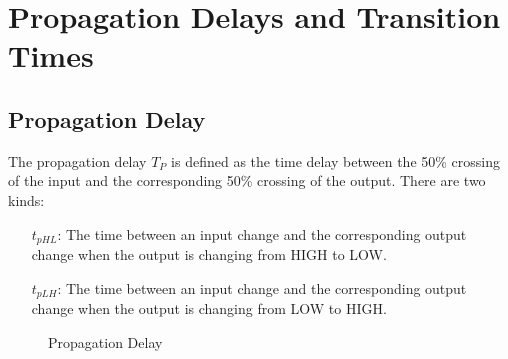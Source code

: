 \section{Propagation Delays and Transition Times}

\subsection{Propagation Delay}

The propagation delay $T_P$ is defined as the time delay between
the 50\% crossing of the input and the corresponding 50\%
crossing of the output. There are two kinds:

\begin{itemize}
    \item[$t_{pHL}$:] The time between an input change and the corresponding output change
          when the output is changing from HIGH to LOW.
    \item[$t_{pLH}$:] The time between an input change and the corresponding output change
          when the output is changing from LOW to HIGH.
\end{itemize}

\begin{figure}
    \caption{Propagation Delay}
    \label{fig:propagationdelay}
\end{figure}

